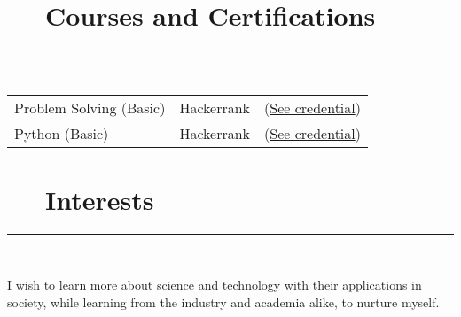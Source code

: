 \documentclass{article}
\begin{document}
\section*{\faLaptop ~~ Courses and Certifications} 
\hrule

\
\newline
\

\begin{tabular}{l l l}

    Problem Solving (Basic) & Hackerrank 
                            & (\href{https://www.hackerrank.com/certificates/8d1db5b492de}{See credential}) \\
    Python (Basic)  & Hackerrank 
                    & (\href{https://www.hackerrank.com/certificates/46699d054d5a}{See credential}) \\ 
\end{tabular}

\section*{\faHeartO ~~ Interests} 
\hrule

\
\newline
\

\noindent I wish to learn more about science and technology with their applications in society, while learning from the industry and academia alike, to nurture myself.
\end{document}
